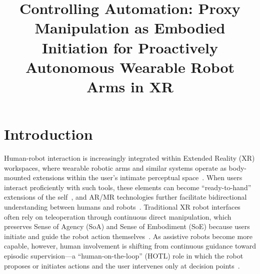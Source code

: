\documentclass[sigconf,review,anonymous]{acmart}
\title{Controlling Automation: Proxy Manipulation as Embodied Initiation for Proactively Autonomous Wearable Robot Arms in XR}
\begin{document}
\maketitle

\section{Introduction}

Human-robot interaction is increasingly integrated within Extended Reality (XR) workspaces, where wearable robotic arms and similar systems operate as body-mounted extensions within the user's intimate perceptual space~\cite{10.1145/3242587.3242665, 10.1145/3706598.3713647, 10.1145/3544548.3581184}. When users interact proficiently with such tools, these elements can become ``ready-to-hand'' extensions of the self~\cite{10.1145/3290605.3300673}, and AR/MR technologies further facilitate bidirectional understanding between humans and robots~\cite{10.1145/3491102.3517719}. Traditional XR robot interfaces often rely on teleoperation through continuous direct manipulation, which preserves Sense of Agency (SoA) and Sense of Embodiment (SoE) because users initiate and guide the robot action themselves~\cite{10.1145/3025453.3025457, 10.1145/3025453.3025689}. As assistive robots become more capable, however, human involvement is shifting from continuous guidance toward episodic supervision---a ``human-on-the-loop'' (HOTL) role in which the robot proposes or initiates actions and the user intervenes only at decision points~\cite{10.1145/3610977.3634993}.
\end{document}
